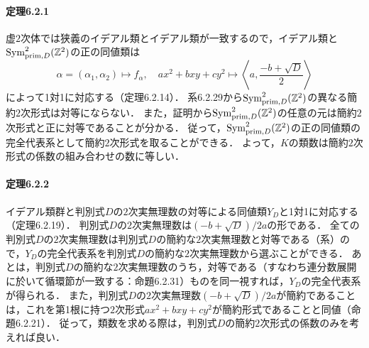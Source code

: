 \paragraph{定理6.2.1}
虚$2$次体では狭義のイデアル類とイデアル類が一致するので，イデアル類と$\operatorname{Sym}_{\mathrm{prim}, D}^2(\mathbb{Z}^2)$の正の同値類は
\[\alpha=(\alpha_1, \alpha_2) \mapsto f_\alpha,\quad ax^2 + bxy + cy^2 \mapsto \left\langle a, \frac{-b + \sqrt{D}}{2} \right\rangle\]
によって1対1に対応する（定理6.2.14）．
系6.2.29から$\operatorname{Sym}_{\mathrm{prim}, D}^2(\mathbb{Z}^2)$の異なる簡約$2$次形式は対等にならない．
また，証明から$\operatorname{Sym}_{\mathrm{prim}, D}^2(\mathbb{Z}^2)$の任意の元は簡約$2$次形式と正に対等であることが分かる．
従って，$\operatorname{Sym}_{\mathrm{prim}, D}^2(\mathbb{Z}^2)$の正の同値類の完全代表系として簡約$2$次形式を取ることができる．
よって，$K$の類数は簡約$2$次形式の係数の組み合わせの数に等しい．

\paragraph{定理6.2.2}
イデアル類群と判別式$D$の$2$次実無理数の対等による同値類$Y_D$と1対1に対応する（定理6.2.19）．
判別式$D$の$2$次実無理数は$(-b+\sqrt{D})/2a$の形である．
全ての判別式$D$の$2$次実無理数は判別式$D$の簡約な$2$次実無理数と対等である（系）ので，$Y_D$の完全代表系を判別式$D$の簡約な$2$次実無理数から選ぶことができる．
あとは，判別式$D$の簡約な$2$次実無理数のうち，対等である（すなわち連分数展開に於いて循環節が一致する：命題6.2.31）ものを同一視すれば，$Y_D$の完全代表系が得られる．
また，判別式$D$の$2$次実無理数$(-b+\sqrt{D})/2a$が簡約であることは，これを第1根に持つ$2$次形式$ax^2+bxy+cy^2$が簡約形式であることと同値（命題6.2.21）．
従って，類数を求める際は，判別式$D$の簡約$2$次形式の係数のみを考えれば良い．
